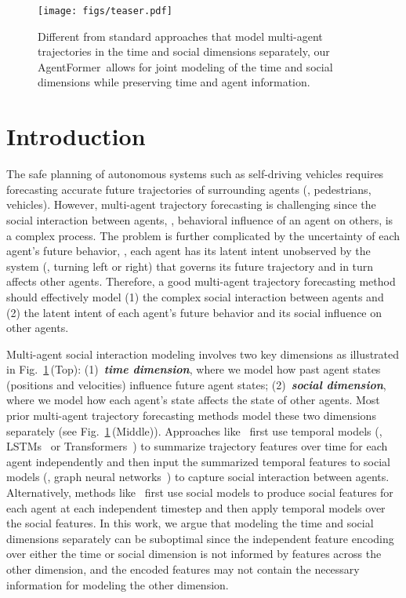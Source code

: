 \documentclass[10pt,twocolumn,letterpaper]{article}
\newcommand{\mname}{AgentFormer}
\begin{document}
\begin{figure}
    \centering
    \texttt{[image: figs/teaser.pdf]}
    \caption{Different from standard approaches that model multi-agent trajectories in the time and social dimensions separately, our \mname\ allows for joint modeling of the time and social dimensions while preserving time and agent information. }
    \label{fig:teaser}
    \vspace{-4mm}
\end{figure}

\vspace{-5mm}
\section{Introduction}
\vspace{-1mm}
\label{sec:intro}
The safe planning of autonomous systems such as self-driving vehicles requires forecasting accurate future trajectories of surrounding agents (\eg, pedestrians, vehicles). However, multi-agent trajectory forecasting is challenging since the social interaction between agents, \ie, behavioral influence of an agent on others, is a complex process. The problem is further complicated by the uncertainty of each agent's future behavior, \ie, each agent has its latent intent unobserved by the system (\eg, turning left or right) that governs its future trajectory and in turn affects other agents. Therefore, a good multi-agent trajectory forecasting method should effectively model (1) the complex social interaction between agents and (2) the latent intent of each agent's future behavior and its social influence on other agents. 

Multi-agent social interaction modeling involves two key dimensions as illustrated in Fig.~\ref{fig:teaser}\,(Top): (1)~\textbf{\emph{time dimension}}, where we model how past agent states (positions and velocities) influence future agent states; (2)~\textbf{\emph{social dimension}}, where we model how each agent's state affects the state of other agents. Most prior multi-agent trajectory forecasting methods model these two dimensions separately (see Fig.~\ref{fig:teaser}\,(Middle)). Approaches like~\cite{kosaraju2019social,alahi2016social,gupta2018social} first use temporal models (\eg, LSTMs~\cite{hochreiter1997long} or Transformers~\cite{vaswani2017attention}) to summarize trajectory features over time for each agent independently and then input the summarized temporal features to social models (\eg, graph neural networks~\cite{kipf2016semi}) to capture social interaction between agents. Alternatively, methods like~\cite{salzmann2020trajectron++,huang2019stgat} first use social models to produce social features for each agent at each independent timestep and then apply temporal models over the social features. In this work, we argue that modeling the time and social dimensions separately can be suboptimal since the independent feature encoding over either the time or social dimension is not informed by features across the other dimension, and the encoded features may not contain the necessary information for modeling the other dimension.
\end{document}
